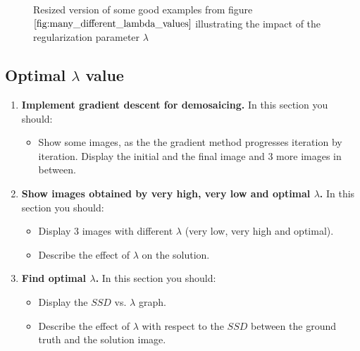 \documentclass{paper}
\begin{document}
\begin{figure}[h!]
\begin{center}
\end{center}

\label{fig:three_different_lambda_values}
\caption{Resized version of some good examples from figure $\ref{fig:many_different_lambda_values}$ illustrating the impact of the regularization parameter $\lambda$}
\end{figure}
 
 











\subsection{Optimal $\lambda$ value}

\begin{enumerate}
\item \textbf{Implement gradient descent for demosaicing.} In this section you should:

\begin{itemize}
\item Show some images, as the the gradient method progresses iteration by iteration. Display the initial and the final image and 3 more images in between.
\end{itemize}

\item \textbf{Show images obtained by very high, very low and optimal $\lambda$.} In this section you should:

\begin{itemize}
\item Display 3 images with different $\lambda$ (very low, very high and optimal).
\item Describe the effect of $\lambda$ on the solution.
\end{itemize}

\item \textbf{ Find optimal $\lambda$.} In this section you should:

\begin{itemize}
\item Display the $SSD$ vs. $\lambda$ graph.
\item Describe the effect of $\lambda$ with respect to the $SSD$ between the ground truth and the solution image.
\end{itemize}


\end{enumerate}


 
\end{document}
